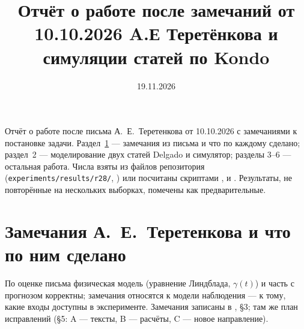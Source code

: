 \documentclass[12pt,a4paper]{article}
\title{Отчёт о работе после замечаний от 10.10.2026 A.Е Теретёнкова и симуляции статей по Kondo}
\date{19.11.2026}
\begin{document}
\maketitle

Отчёт о работе после письма А.~Е.~Теретенкова от 10.10.2026 с замечаниями к постановке задачи.
Раздел~\ref{sec:remarks} --- замечания из письма и что по каждому сделано; раздел~2 --- моделирование двух
статей Delgado и симулятор; разделы 3--6 --- остальная работа.
Числа взяты из файлов репозитория (\texttt{experiments/results/r28/},
) или посчитаны скриптами
,  и .
Результаты, не повторённые на нескольких выборках, помечены как предварительные.

\section{Замечания А.~Е.~Теретенкова и что по ним сделано}\label{sec:remarks}

По оценке письма физическая модель (уравнение Линдблада, $\gamma(t)$) и часть с прогнозом корректны;
замечания относятся к модели наблюдения --- к тому, какие входы доступны в эксперименте. Замечания
записаны в , §3; там же план исправлений (§5: A --- тексты, B --- расчёты,
C --- новое направление).
\end{document}
